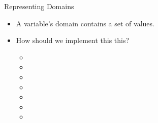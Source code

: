\documentclass{beamer}
\begin{document}
\begin{frame}{Representing Domains}
    \begin{itemize}
        \item A variable's domain contains a set of values.
        \item How should we implement this this?
            \begin{itemize}
                \item {}
                \item {}
                \item {}
                \item {}
                \item {}
                \item {}
                \item {}
            \end{itemize}
    \end{itemize}
\end{frame}
\end{document}
